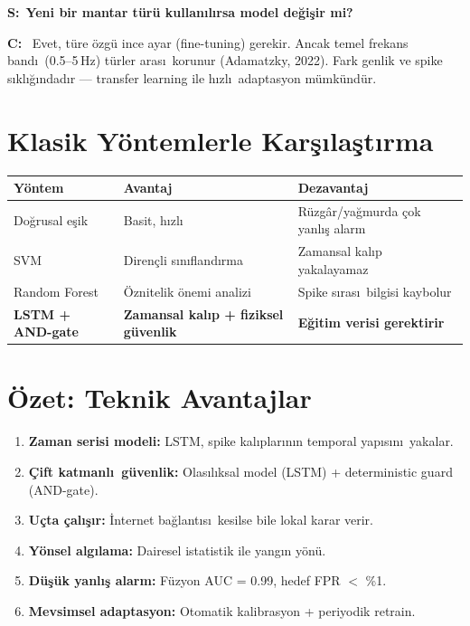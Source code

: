 \documentclass[11pt,a4paper]{article}
\newcommand{\soru}[1]{\vskip12pt\noindent\textcolor{ember}{\textbf{S:}}~\textbf{#1}\par\vskip4pt\noindent\textcolor{myco}{\textbf{C:}}~}
\begin{document}
\soru{Yeni bir mantar t\"ur\"u kullan\i l\i rsa model de\u{g}i\c{s}ir mi?}
Evet, t\"ure \"ozg\"u ince ayar (fine-tuning) gerekir. Ancak temel frekans band\i\ (0.5--5\,Hz) t\"urler aras\i\ korunur (Adamatzky, 2022). Fark genlik ve spike s\i kl\i\u{g}\i ndad\i r --- transfer learning ile h\i zl\i\ adaptasyon m\"umk\"und\"ur.

\section{Klasik Y\"ontemlerle Kar\c{s}\i la\c{s}t\i rma}

\begin{center}
  \begin{tabular}{p{3cm}p{4cm}p{4cm}}
    \toprule
    \textbf{Y\"ontem} & \textbf{Avantaj} & \textbf{Dezavantaj} \\
    \midrule
    Do\u{g}rusal e\c{s}ik & Basit, h\i zl\i & R\"uzg\^ar/ya\u{g}murda \c{c}ok yanl\i\c{s} alarm \\
    SVM & Diren\c{c}li s\i n\i fland\i rma & Zamansal kal\i p yakalayamaz \\
    Random Forest & \"Oznitelik \"onemi analizi & Spike s\i ras\i\ bilgisi kaybolur \\
    \textbf{LSTM + AND-gate} & \textbf{Zamansal kal\i p + fiziksel g\"uvenlik} & \textbf{E\u{g}itim verisi gerektirir} \\
    \bottomrule
  \end{tabular}
\end{center}

\section{\"Ozet: Teknik Avantajlar}

\begin{enumerate}
  \item \textbf{Zaman serisi modeli:} LSTM, spike kal\i plar\i n\i n temporal yap\i s\i n\i\ yakalar.
  \item \textbf{\c{C}ift katmanl\i\ g\"uvenlik:} Olas\i l\i ksal model (LSTM) + deterministic guard (AND-gate).
  \item \textbf{U\c{c}ta \c{c}al\i\c{s}\i r:} \.Internet ba\u{g}lant\i s\i\ kesilse bile lokal karar verir.
  \item \textbf{Y\"onsel alg\i lama:} Dairesel istatistik ile yang\i n y\"on\"u.
  \item \textbf{D\"u\c{s}\"uk yanl\i\c{s} alarm:} F\"uzyon AUC = 0.99, hedef FPR $<$ \%1.
  \item \textbf{Mevsimsel adaptasyon:} Otomatik kalibrasyon + periyodik retrain.
\end{enumerate}
\end{document}
